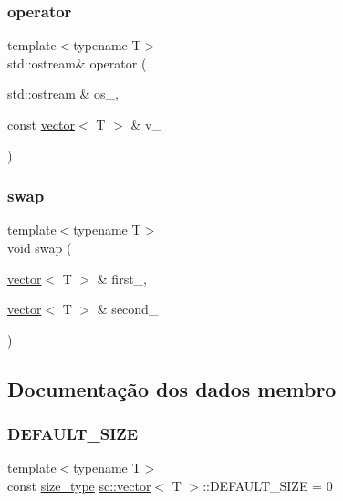 \subsubsection{\texorpdfstring{operator}{operator}}
{\footnotesize\ttfamily template$<$typename T$>$ \\
std\+::ostream\& operator (\begin{DoxyParamCaption}\item[{std\+::ostream \&}]{os\+\_\+,  }\item[{const \hyperlink{classsc_1_1vector}{vector}$<$ T $>$ \&}]{v\+\_\+ }\end{DoxyParamCaption})\hspace{0.3cm}{\ttfamily [friend]}}

\mbox{\label{classsc_1_1vector_a9198beeb05f24ba2eadccab0a606063c}} 
\subsubsection{\texorpdfstring{swap}{swap}}
{\footnotesize\ttfamily template$<$typename T$>$ \\
void swap (\begin{DoxyParamCaption}\item[{\hyperlink{classsc_1_1vector}{vector}$<$ T $>$ \&}]{first\+\_\+,  }\item[{\hyperlink{classsc_1_1vector}{vector}$<$ T $>$ \&}]{second\+\_\+ }\end{DoxyParamCaption})\hspace{0.3cm}{\ttfamily [friend]}}



\subsection{Documentação dos dados membro}
\mbox{\label{classsc_1_1vector_a287b97d30cd9f7540da7d5ef628e49a7}} 
\subsubsection{\texorpdfstring{D\+E\+F\+A\+U\+L\+T\+\_\+\+S\+I\+ZE}{DEFAULT\_SIZE}}
{\footnotesize\ttfamily template$<$typename T$>$ \\
const \hyperlink{classsc_1_1vector_a48bf37ba1a6d0c13504414d86e27c399}{size\+\_\+type} \hyperlink{classsc_1_1vector}{sc\+::vector}$<$ T $>$\+::D\+E\+F\+A\+U\+L\+T\+\_\+\+S\+I\+ZE = 0\hspace{0.3cm}{\ttfamily [static]}}



